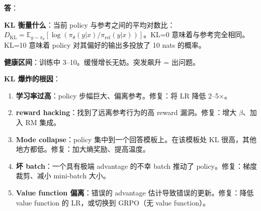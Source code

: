 \begin{questionbox}
\textbf{答}：

\textbf{KL 衡量什么}：当前 policy 与参考之间的平均对数比：$D_\text{KL} = \mathbb{E}_{y\sim\pi_\theta}[\log(\pi_\theta(y|x)/\pi_\text{ref}(y|x))]$。KL=0 意味着与参考完全相同。KL=10 意味着 policy 对其偏好的输出多投放了 10 nats 的概率。

\textbf{健康区间}：训练中 3--10。缓慢增长无妨。突发飙升 = 出问题。

\textbf{KL 爆炸的根因}：

\begin{enumerate}
  \item \textbf{学习率过高}：policy 步幅巨大、偏离参考。修复：将 LR 降低 2--5$\times$。
  \item \textbf{reward hacking}：找到了远离参考行为的高 reward 漏洞。修复：增大 $\beta$、加入 RM 集成。
  \item \textbf{Mode collapse}：policy 集中到一个回答模板上。在该模板处 KL 很高，其他地方都低。修复：加大熵奖励、提高温度。
  \item \textbf{坏 batch}：一个具有极端 advantage 的不幸 batch 推动了 policy。修复：梯度裁剪、减小 mini-batch 大小。
  \item \textbf{Value function 偏离}：错误的 advantage 估计导致错误的更新。修复：降低 value function 的 LR，或切换到 GRPO（无 value function）。
\end{enumerate}


\end{questionbox}
